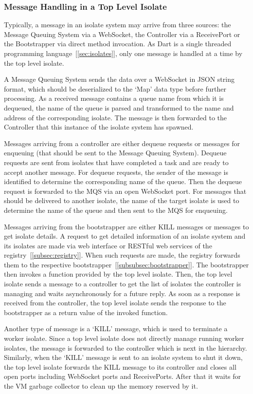   \subsubsection{Message Handling in a Top Level Isolate}
  Typically, a message in an isolate system may arrive from three sources: the Message Queuing System via a WebSocket, the Controller via a ReceivePort or the Bootstrapper via direct method invocation. As Dart is a single threaded programming language~[\autoref{sec:isolates}], only one message is handled at a time by the top level isolate.

  A Message Queuing System sends the data over a WebSocket in JSON string format, which should be deserialized to the ‘Map’ data type before further processing. As a received message contains a queue name from which it is dequeued, the name of the queue is parsed and transformed to the name and address of the corresponding isolate. The message is then forwarded to the Controller that this instance of the isolate system has spawned.

  Messages arriving from a controller are either dequeue requests or messages for enqueuing (that should be sent to the Message Queuing System). Dequeue requests are sent from isolates that have completed a task and are ready to accept another message. For dequeue requests, the sender of the message is identified to determine the corresponding name of the queue. Then the dequeue request is forwarded to the MQS via an open WebSocket port. For messages that should be delivered to another isolate, the name of the target isolate is used to determine the name of the queue and then sent to the MQS for enqueuing.

Messages arriving from the bootstrapper are either KILL messages or messages to get isolate details. A request to get detailed information of an isolate system and its isolates are made via web interface or RESTful web services of the registry~[\autoref{subsec:registry}]. When such requests are made, the registry forwards them to the respective bootstrapper~[\autoref{subsubsec:bootstrapper}]. The bootstrapper then invokes a function provided by the top level isolate. Then, the top level isolate sends a message to a controller to get the list of isolates the controller is managing and waits asynchronously for a future reply. As soon as a response is received from the controller, the top level isolate sends the response to the bootstrapper as a return value of the invoked function.

  Another type of message is a ‘KILL’ message, which is used to terminate a worker isolate. Since a top level isolate does not directly manage running worker isolates, the message is forwarded to the controller which is next in the hierarchy. Similarly, when the ‘KILL’ message is sent to an isolate system to shut it down, the top level isolate forwards the KILL message to its controller and closes all open ports including WebSocket ports and ReceivePorts. After that it waits for the VM garbage collector to clean up the memory reserved by it.

